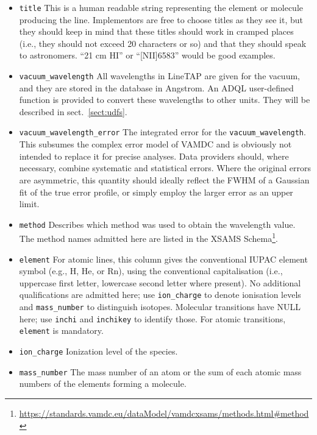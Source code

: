 \documentclass[11pt,a4paper]{ivoa}
\begin{document}
\begin{itemize}

\item \texttt{title} This is a human readable string representing the
element or molecule producing the line.  Implementors are free to choose
titles as they see it, but they should keep in mind that these titles
should work in cramped places (i.e., they should not exceed 20
characters or so) and that they should speak to astronomers.  ``21 cm
HI'' or ``[NII]6583'' would be good examples.

\item \texttt{vacuum\_wavelength}
All wavelengths in LineTAP are given for the vacuum,
and  they are stored in the database in
Angstrom.  An  ADQL user-defined function is provided to convert these
wavelengths to other units. They will be described in
sect.~\ref{sect:udfs}.

\item \texttt{vacuum\_wavelength\_error} The integrated error for the 
\texttt{vacuum\_wave\-length}.  This subsumes the complex error model of
VAMDC and is obviously not intended to replace it for precise analyses.
Data providers should, where necessary, combine systematic and
statistical errors.  Where the original errors are asymmetric, this
quantity should ideally reflect the FWHM of a Gaussian fit of the true
error profile, or simply employ the larger error as an upper limit.

\item \texttt{method} Describes which method was used to obtain the
wavelength value. The method names admitted here are listed in the XSAMS
Schema\footnote{\url{https://standards.vamdc.eu/dataModel/vamdcxsams/methods.html\#method}}.

\item \texttt{element} For atomic lines, this column gives the
conventional IUPAC element symbol (e.g., H, He, or Rn), using the
conventional capitalisation (i.e., uppercase first letter, lowercase
second letter where present).  No additional qualifications are admitted
here; use \texttt{ion\_charge} to denote ionisation levels and
\texttt{mass\_number} to distinguish isotopes.  Molecular transitions
have NULL here; use \texttt{inchi} and \texttt{inchikey} to identify
those.  For atomic transitions, \texttt{element} is mandatory.

\item \texttt{ion\_charge} Ionization level of the species.

\item \texttt{mass\_number} The mass number of an atom or the sum of
each atomic mass numbers of the elements forming a molecule.


\end{itemize}
\end{document}
